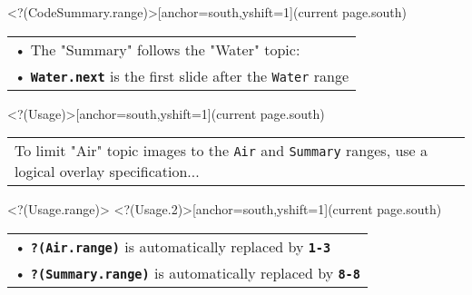 \Sticky<?(CodeSummary.range)>[anchor=south,yshift=1\baselineskip](current page.south){\bfseries\begin{tabular}{p{}}
• The "Summary" follows the "Water" topic:\\
• \texttt{\bfseries{Water.next}} is the first slide after the \texttt{Water} range
\end{tabular}}%
\Sticky<?(Usage)>[anchor=south,yshift=1\baselineskip](current page.south){\bfseries\begin{tabular}{p{}}
To limit "Air" topic images to the \texttt{Air} and \texttt{Summary} ranges,
use a logical overlay specification...
\end{tabular}}%
\only<?(Usage.range)> {
}%
\Sticky<?(Usage.2)>[anchor=south,yshift=1\baselineskip](current page.south){\bfseries\begin{tabular}{p{}}%
• \textcolor{MyGreen}{\texttt{\bfseries?(Air.range)}} is automatically replaced by \textcolor{MyGreen}{\bfseries\texttt{1-3}}\\
• \textcolor{MyGreen}{\texttt{\bfseries?(Summary.range)}} is automatically replaced by \textcolor{MyGreen}{\bfseries\texttt{8-8}}
\end{tabular}}%

